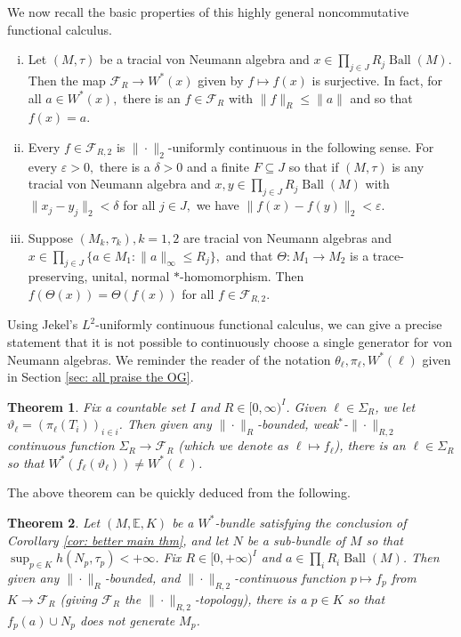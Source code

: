 \documentclass[10pt]{amsart}
\newtheorem{thm}{Theorem}[section]
\theoremstyle{definition}
\numberwithin{equation}{section}
\newcommand{\bE}{{\mathbb E}}
\newcommand{\cF}{{\mathcal F}}
\DeclareMathOperator{\Ball}{Ball}
\begin{document}
We now recall the basic properties of this highly general noncommutative functional calculus.
\begin{enumerate}[(i)]
\item Let $(M,\tau)$ be a tracial von Neumann  algebra and $x\in \prod_{j\in J}R_{j}\Ball(M)$. Then the map $\mathcal{F}_{R}\to W^{*}(x)$ given by $f\mapsto f(x)$ is surjective. In fact, for all $a\in W^{*}(x),$ there is an $f\in \mathcal{F}_{R}$ with $\|f\|_{R}\leq \|a\|$ and so that $f(x)=a.$ \label{item:surjective nc func calc}
\item Every $f\in \mathcal{F}_{R,2}$ is $\|\cdot\|_{2}$-uniformly continuous in the following sense. For every $\varepsilon>0,$ there is a $\delta>0$ and a finite $F\subseteq J$ so that if $(M,\tau)$ is any tracial von Neumann algebra and $x,y\in \prod_{j\in J}R_{j}\Ball(M)$ with $\|x_{j}-y_{j}\|_{2}<\delta$ for all $j\in J,$ we have $\|f(x)-f(y)\|_{2}<\varepsilon.$ \label{item:unif cont nc func calc}
\item \label{item:naturality of nc func calc}
Suppose $(M_{k},\tau_{k}),k=1,2$ are tracial von Neumann algebras and $x\in \prod_{j\in J}\{a\in M_{1}:\|a\|_{\infty}\leq R_{j}\},$ and that $\Theta\colon M_{1}\to M_{2}$ is a trace-preserving, unital, normal $*$-homomorphism. Then $f(\Theta(x))=\Theta(f(x))$ for all $f\in \mathcal{F}_{R,2}.$
\end{enumerate}



Using Jekel's $L^{2}$-uniformly continuous functional calculus, we can give a precise statement that it is not possible to continuously choose a single generator for von Neumann algebras. We reminder the reader of the notation $\theta_{\ell},\pi_{\ell},W^{*}(\ell)$ given in Section \ref{sec: all praise the OG}.

\begin{thm}\label{thm: cont func of law}
Fix a countable set $I$ and $R\in [0,\infty)^{I}$. Given $\ell\in \Sigma_{R}$, we let $\vartheta_{\ell}=(\pi_{\ell}(T_{i}))_{i\in i}$. 
Then given any $\|\cdot\|_{R}$-bounded, weak$^{*}$-$\|\cdot\|_{R,2}$ continuous function $\Sigma_{R}\to \cF_{R}$ (which we denote as $\ell\mapsto f_{\ell}$), there is an $\ell\in \Sigma_{R}$ so that  $W^{*}(f_{\ell}(\vartheta_{\ell}))\neq W^{*}(\ell)$.  
\end{thm}

The above theorem can be quickly deduced from the following.


\begin{thm}\label{thm: no continuous algorithm}
Let $(M,\bE,K)$ be a $W^{*}$-bundle satisfying the conclusion of Corollary \ref{cor: better main thm}, and let $N$ be a sub-bundle of $M$ so that $\sup_{p\in K}h(N_{p},\tau_{p})<+\infty$. Fix $R\in [0,+\infty)^{I}$ and $a\in \prod_{i}R_{i}\Ball(M)$. Then given any $\|\cdot\|_{R}$-bounded, and $\|\cdot\|_{R,2}$-continuous function $p\mapsto f_{p}$ from $K\to \cF_{R}$ (giving $\cF_{R}$ the $\|\cdot\|_{R,2}$-topology), there is a $p\in K$ so that $f_{p}(a)\cup N_{p}$ does not generate $M_{p}$.   
\end{thm}
\end{document}
